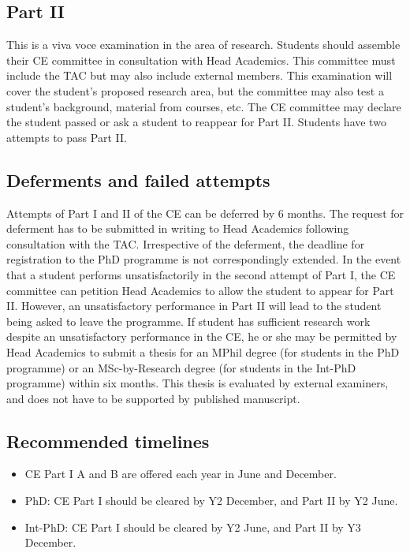 \documentclass[a4paper,10pt]{article}
\begin{document}
\subsection{Part II}
This is a viva voce examination in the area of research. Students should assemble
their CE committee in consultation with Head Academics. This committee must include the
TAC but may also include external members. This examination will cover the student’s
proposed research area, but the committee may also test a student’s background, material
from courses, etc. The CE committee may declare the student passed or ask a student to
reappear for Part II. Students have two attempts to pass Part II.

\subsection{Deferments and failed attempts}
Attempts of Part I and II of the CE can be deferred by 6
months. The request for deferment has to be submitted in writing to Head Academics
following consultation with the TAC. Irrespective of the deferment, the deadline for
registration to the PhD programme is not correspondingly extended. In the event that a
student performs unsatisfactorily in the second attempt of Part I, the CE committee can
petition Head Academics to allow the student to appear for Part II. However, an
unsatisfactory performance in Part II will lead to the student being asked to leave the
programme. If student has sufficient research work despite an unsatisfactory performance in
the CE, he or she may be permitted by Head Academics to submit a thesis for an MPhil
degree (for students in the PhD programme) or an MSc-by-Research degree (for students in
the Int-PhD programme) within six months. This thesis is evaluated by external examiners,
and does not have to be supported by published manuscript.

\subsection{Recommended timelines}

\begin{itemize}
    \item CE Part I A and B are offered each year in June and December.
    \item PhD: CE Part I should be cleared by Y2 December, and Part II by Y2 June.
    \item Int-PhD: CE Part I should be cleared by Y2 June, and Part II by Y3 December.
\end{itemize}
\end{document}

